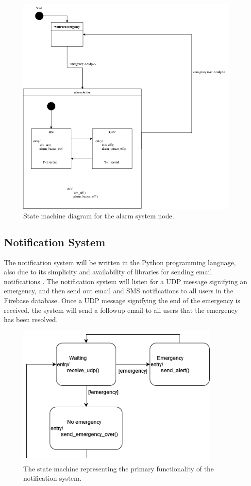 \begin{figure}[H]
    \centering
    \includegraphics[width=\linewidth]{../assets/state-machine/AlarmSystemStateMachine.png}
    \caption{State machine diagram for the alarm system node.}
\end{figure}

\subsection{Notification System}

The notification system will be written in the Python programming language, also due to its simplicity and availability
of libraries for sending email notifications \cite{python-email}. The notification system will listen for a UDP message
signifying an emergency, and then send out email and SMS notifications to all users in the Firebase database. Once a
UDP message signifying the end of the emergency is received, the system will send a followup email to all users that
the emergency has been resolved.

\begin{figure}[H]
    \centering
    \includegraphics[width=4in]{../assets/state-machine/NotificationSystemStateMachine.png}
    \caption{The state machine representing the primary functionality of the notification system.}
\end{figure}

